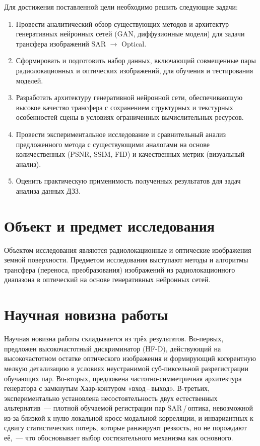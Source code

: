 Для достижения поставленной цели необходимо решить следующие задачи:
\begin{enumerate}[label*=\arabic*.]
    \item Провести аналитический обзор существующих методов и архитектур генеративных нейронных сетей (GAN, диффузионные модели) для задачи трансфера изображений SAR $\rightarrow$ Optical.
    \item Сформировать и подготовить набор данных, включающий совмещенные пары радиолокационных и оптических изображений, для обучения и тестирования моделей.
    \item Разработать архитектуру генеративной нейронной сети, обеспечивающую высокое качество трансфера с сохранением структурных и текстурных особенностей сцены в условиях ограниченных вычислительных ресурсов.
    \item Провести экспериментальное исследование и сравнительный анализ предложенного метода с существующими аналогами на основе количественных (PSNR, SSIM, FID) и качественных метрик (визуальный анализ).
    \item Оценить практическую применимость полученных результатов для задач анализа данных ДЗЗ.
\end{enumerate}

\section{Объект и предмет исследования}
Объектом исследования являются радиолокационные и оптические изображения земной поверхности.
Предметом исследования выступают методы и алгоритмы трансфера (переноса, преобразования) изображений из радиолокационного диапазона в оптический на основе генеративных нейронных сетей.

\section{Научная новизна работы}
Научная новизна работы складывается из трёх результатов.
Во-первых, предложен высокочастотный дискриминатор (HF-D), действующий на высокочастотном остатке оптического изображения и формирующий когерентную мелкую детализацию в условиях неустранимой суб-пиксельной разрегистрации обучающих пар.
Во-вторых, предложена частотно-симметричная архитектура генератора с замкнутым Хаар-контуром «вход\,--\,выход».
В-третьих, экспериментально установлена несостоятельность двух естественных альтернатив~--- плотной обучаемой регистрации пар SAR\,/\,оптика, невозможной из-за близкой к нулю локальной кросс-модальной корреляции, и инвариантных к сдвигу статистических потерь, которые ранжируют резкость, но не порождают её,~--- что обосновывает выбор состязательного механизма как основного.

